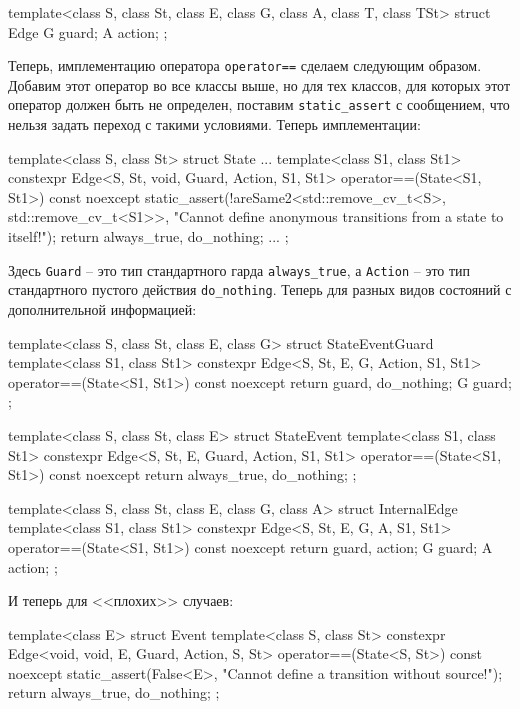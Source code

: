 \documentclass{article}
\begin{document}
{\begin{cppcode}[\nonumbers]
template<class S, class St, class E, class G, class A, class T, class TSt>
struct Edge {
  G guard;
  A action;
};
\end{cppcode}
Теперь, имплементацию оператора \verb"operator==" сделаем следующим образом.
Добавим этот оператор во все классы выше, но для тех классов, для которых этот оператор должен быть не определен, поставим \verb"static_assert" с сообщением, что нельзя задать переход с такими условиями.
Теперь имплементации:
\begin{cppcode}[\nonumbers]
template<class S, class St>
struct State {
  ...
  template<class S1, class St1>
  constexpr Edge<S, St, void, Guard, Action, S1, St1> operator==(State<S1, St1>) const noexcept {
    static_assert(!areSame2<std::remove_cv_t<S>, std::remove_cv_t<S1>>,
                  "Cannot define anonymous transitions from a state to itself!");
    return {always_true, do_nothing};
  }
  ...
};
\end{cppcode}
Здесь \verb"Guard" -- это тип стандартного гарда \verb"always_true", а \verb"Action" -- это тип стандартного пустого действия \verb"do_nothing".
Теперь для разных видов состояний с дополнительной информацией:
\begin{cppcode}[\nonumbers]
template<class S, class St, class E, class G>
struct StateEventGuard {
  template<class S1, class St1>
  constexpr Edge<S, St, E, G, Action, S1, St1>
  operator==(State<S1, St1>) const noexcept {
    return {guard, do_nothing};
  }
  G guard;
};

template<class S, class St, class E>
struct StateEvent {
  template<class S1, class St1>
  constexpr Edge<S, St, E, Guard, Action, S1, St1> operator==(State<S1, St1>) const noexcept {
    return {always_true, do_nothing};
  }
};

template<class S, class St, class E, class G, class A>
struct InternalEdge  {
  template<class S1, class St1>
  constexpr Edge<S, St, E, G, A, S1, St1> operator==(State<S1, St1>) const noexcept {
    return {guard, action};
  }
  G guard;
  A action;
};
\end{cppcode}
И теперь для <<плохих>> случаев:
\begin{cppcode}[\nonumbers]
template<class E>
struct Event {
  template<class S, class St>
  constexpr Edge<void, void, E, Guard, Action, S, St> operator==(State<S, St>) const noexcept {
    static_assert(False<E>, "Cannot define a transition without source!");
    return {always_true, do_nothing};
  }
};


\end{cppcode}}
\end{document}
